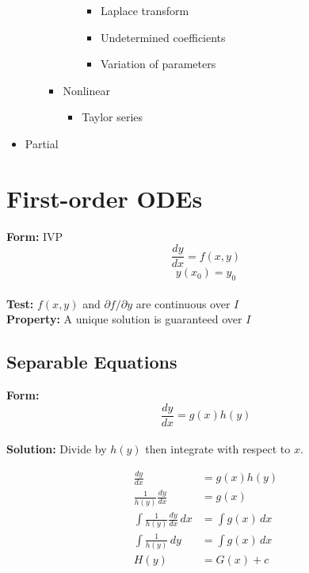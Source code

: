 \documentclass{article}
\begin{document}
\begin{itemize}
\begin{itemize}
\begin{itemize}
\begin{itemize}
\begin{itemize}
                                  \item Laplace transform

                                  \item Undetermined coefficients

                                  \item Variation of parameters
                                \end{itemize}
                        \end{itemize}

                  \item Nonlinear

                        \begin{itemize}
                          \item Taylor series
                        \end{itemize}
                \end{itemize}
        \end{itemize}

  \item Partial
\end{itemize}

\section{First-order ODEs}

\textbf{Form:} IVP \[\frac{d y}{d x} = f(x, y)\] \[y(x_0) = y_0\] \\ \textbf{Test:} $f(x, y)$ and $\partial f / \partial y$ are continuous over $I$ \\ \textbf{Property:} A unique solution is guaranteed over $I$

\subsection{Separable Equations}

\textbf{Form:} \[\frac{d y}{d x} = g(x) h(y)\] \\ \textbf{Solution:} Divide by $h(y)$ then integrate with respect to $x$.

\begin{align*}
  \frac{d y}{d x}                          & = g(x) h(y)      \\
  \frac{1}{h(y)} \frac{d y}{d x}           & = g(x)           \\
  \int \frac{1}{h(y)} \frac{d y}{d x} \,dx & = \int g(x) \,dx \\
  \int \frac{1}{h(y)} \,dy                 & = \int g(x) \,dx \\
  H(y)                                     & = G(x) + c
\end{align*}
\end{document}
